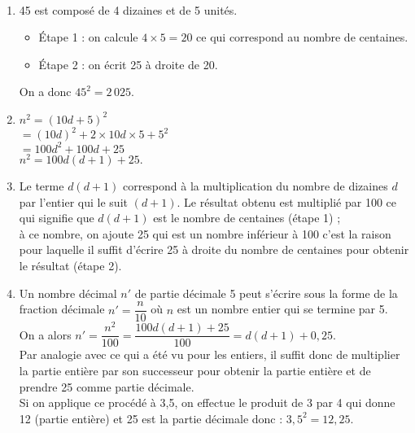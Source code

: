 \ \\ [-5mm]
   \begin{enumerate}
      \item 45 est composé de 4 dizaines et de 5 unités.
      \begin{itemize}
         \item Étape 1 : on calcule $4\times5 =20$ ce qui correspond au nombre de centaines.
         \item Étape 2 : on écrit 25 à droite de 20.
      \end{itemize}
      On a donc {\blue $45^2 =2\,025$.}
      \item $n^2 =(10d+5)^2$ \\
        \hspace*{0.8cm} $=(10d)^2+2\times10d\times5+5^2$ \\
         \hspace*{0.8cm} $=100d^2+100d+25$ \\
         \hspace*{0.4cm} {\blue $n^2 =100d(d+1)+25.$}
   \end{enumerate}

\Coupe

   \begin{enumerate}
   \setcounter{enumi}{2}
      \item Le terme \og $d(d+1)$ \fg{} correspond à la multiplication du nombre de dizaines $d$ par l'entier qui le suit $(d+1)$. Le résultat obtenu est multiplié par 100 ce qui signifie que $d(d+1)$ est le nombre de centaines (étape 1) ; \\
         à ce nombre, on ajoute 25 qui est un nombre inférieur à 100 c'est la raison pour laquelle il suffit d'écrire 25 à droite du nombre de centaines pour obtenir le résultat (étape 2).
      \item Un nombre décimal $n'$ de partie décimale 5 peut s'écrire sous la forme de la fraction décimale $n' =\dfrac{n}{10}$ où $n$ est un nombre entier qui se termine par 5. \\
         On a alors $n' =\dfrac{n^2}{100} =\dfrac{100d(d+1)+25}{100} =d(d+1)+0,25$. \\ [1mm]
         Par analogie avec ce qui a été vu pour les entiers, il suffit donc de multiplier la partie entière par son successeur pour obtenir la partie entière et de prendre 25 comme partie décimale. \\
         Si on applique ce procédé à 3,5, on effectue le produit de 3 par 4 qui donne 12 (partie entière) et 25 est la partie décimale donc : {\blue $3,5^2 =12,25$.}
   \end{enumerate}
